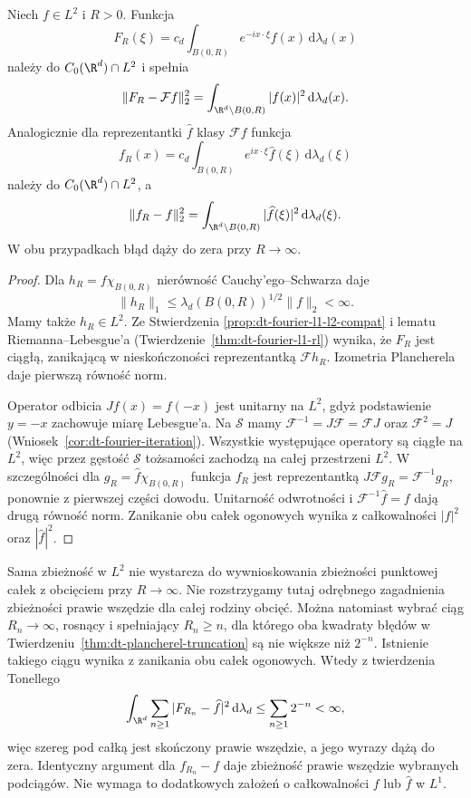 \begin{twierdzenie}
\label{thm:dt-plancherel-truncation}
Niech $f\in L^2$ i $R>0$. Funkcja
\[
 F_R(\xi)=c_d\int_{B(0,R)}e^{-ix\cdot\xi}f(x)
 \,\mathrm d\lambda_d(x)
\]
należy do $C_0(\R^d)\cap L^2$ i spełnia
\[
 \|F_R-\mathcal Ff\|_2^2
 =\int_{\R^d\setminus B(0,R)}|f(x)|^2\,\mathrm d\lambda_d(x).
\]
Analogicznie dla reprezentantki $\widehat f$ klasy
$\mathcal F f$ funkcja
\[
 f_R(x)=c_d\int_{B(0,R)}e^{ix\cdot\xi}\widehat f(\xi)
 \,\mathrm d\lambda_d(\xi)
\]
należy do $C_0(\R^d)\cap L^2$, a
\[
 \|f_R-f\|_2^2
 =\int_{\R^d\setminus B(0,R)}|\widehat f(\xi)|^2
 \,\mathrm d\lambda_d(\xi).
\]
W obu przypadkach błąd dąży do zera przy $R\to\infty$.
\end{twierdzenie}
\begin{proof}
Dla $h_R=f\chi_{B(0,R)}$ nierówność
Cauchy'ego--Schwarza daje
\[
 \|h_R\|_1\le\lambda_d(B(0,R))^{1/2}\|f\|_2<\infty.
\]
Mamy także $h_R\in L^2$. Ze Stwierdzenia
\ref{prop:dt-fourier-l1-l2-compat} i lematu
Riemanna--Lebesgue'a (Twierdzenie~\ref{thm:dt-fourier-l1-rl})
wynika, że $F_R$ jest ciągłą, zanikającą w nieskończoności
reprezentantką $\mathcal Fh_R$. Izometria Plancherela daje
pierwszą równość norm.

Operator odbicia $Jf(x)=f(-x)$ jest unitarny na $L^2$,
gdyż podstawienie $y=-x$ zachowuje miarę Lebesgue'a.
Na $\mathcal S$ mamy
$\mathcal F^{-1}=J\mathcal F=\mathcal FJ$ oraz
$\mathcal F^2=J$ (Wniosek~\ref{cor:dt-fourier-iteration}).
Wszystkie występujące operatory są ciągłe na $L^2$,
więc przez gęstość $\mathcal S$ tożsamości zachodzą
na całej przestrzeni $L^2$. W szczególności dla
$g_R=\widehat f\chi_{B(0,R)}$ funkcja $f_R$ jest
reprezentantką $J\mathcal Fg_R=\mathcal F^{-1}g_R$,
ponownie z pierwszej części dowodu. Unitarność
odwrotności i $\mathcal F^{-1}\widehat f=f$
dają drugą równość norm.
Zanikanie obu całek ogonowych wynika z całkowalności
$|f|^2$ oraz $|\widehat f|^2$.
\end{proof}

\begin{uwaga}
Sama zbieżność w $L^2$ nie wystarcza do wywnioskowania
zbieżności punktowej całek z obcięciem przy $R\to\infty$.
Nie rozstrzygamy tutaj odrębnego zagadnienia zbieżności
prawie wszędzie dla całej rodziny obcięć. Można natomiast wybrać ciąg $R_n\to\infty$,
rosnący i spełniający $R_n\ge n$, dla którego oba kwadraty
błędów w Twierdzeniu~\ref{thm:dt-plancherel-truncation}
są nie większe niż $2^{-n}$. Istnienie takiego ciągu
wynika z zanikania obu całek ogonowych. Wtedy z twierdzenia Tonellego
\[
 \int_{\R^d}\sum_{n\ge1}|F_{R_n}-\widehat f|^2
 \,\mathrm d\lambda_d\le\sum_{n\ge1}2^{-n}<\infty,
\]
więc szereg pod całką jest skończony prawie wszędzie,
a jego wyrazy dążą do zera. Identyczny argument dla
$f_{R_n}-f$ daje zbieżność prawie wszędzie wybranych
podciągów. Nie wymaga to dodatkowych założeń o
całkowalności $f$ lub $\widehat f$ w $L^1$.
\end{uwaga}

